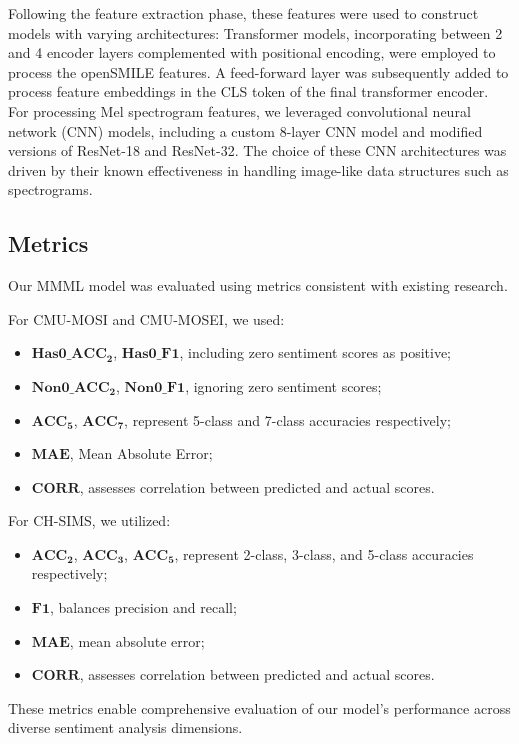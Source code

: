 \documentclass[11pt]{article}
\begin{document}
Following the feature extraction phase, these features were used to construct models with varying architectures: Transformer models, incorporating between 2 and 4 encoder layers complemented with positional encoding, were employed to process the openSMILE features. A feed-forward layer was subsequently added to process feature embeddings in the CLS token of the final transformer encoder. For processing Mel spectrogram features, we leveraged convolutional neural network (CNN) models, including a custom 8-layer CNN model and modified versions of ResNet-18 and ResNet-32. The choice of these CNN architectures was driven by their known effectiveness in handling image-like data structures such as spectrograms.

\subsection{Metrics}
Our MMML model was evaluated using metrics consistent with existing research. 

For CMU-MOSI and CMU-MOSEI, we used: 
\begin{itemize}
\item $\mathbf{Has0\_ACC_2}$, $\mathbf{Has0\_F1}$, including zero sentiment scores as positive; 
\item $\mathbf{Non0\_ACC_2}$, $\mathbf{Non0\_F1}$, ignoring zero sentiment scores;
\item $\mathbf{ACC_5}$, $\mathbf{ACC_7}$, represent 5-class and 7-class accuracies respectively; 
\item $\mathbf{MAE}$, Mean Absolute Error; 
\item $\mathbf{CORR}$, assesses correlation between predicted and actual scores.
\end{itemize}

For CH-SIMS, we utilized:
\begin{itemize}
\item $\mathbf{ACC_2}$, $\mathbf{ACC_3}$, $\mathbf{ACC_5}$, represent 2-class, 3-class, and 5-class accuracies respectively; 
\item $\mathbf{F1}$, balances precision and recall; 
\item $\mathbf{MAE}$, mean absolute error; 
\item $\mathbf{CORR}$, assesses correlation between predicted and actual scores.
\end{itemize}
These metrics enable comprehensive evaluation of our model's performance across diverse sentiment analysis dimensions.
\end{document}
